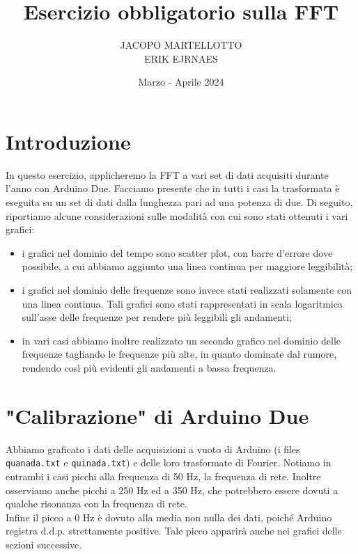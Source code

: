 \documentclass{article}[a4paper, oneside,11pt]
\title{Esercizio obbligatorio sulla FFT}
\author{JACOPO MARTELLOTTO\\ERIK EJRNAES}
\date{Marzo - Aprile 2024}
\begin{document}
\maketitle

\section{Introduzione}
In questo esercizio, applicheremo la FFT a vari set di dati acquisiti durante l'anno con Arduino Due. Facciamo presente che in tutti i casi la trasformata è eseguita su un set di dati dalla lunghezza pari ad una potenza di due. Di seguito, riportiamo alcune considerazioni sulle modalità con cui sono stati ottenuti i vari grafici:
\begin{itemize}
    \item i grafici nel dominio del tempo sono scatter plot, con barre d'errore dove possibile, a cui abbiamo aggiunto una linea continua per maggiore leggibilità;
    \item i grafici nel dominio delle frequenze sono invece stati realizzati solamente con una linea continua. Tali grafici sono stati rappresentati in scala logaritmica sull'asse delle frequenze per rendere più leggibili gli andamenti; 
    \item in vari casi abbiamo inoltre realizzato un secondo grafico nel dominio delle frequenze tagliando le frequenze più alte, in quanto dominate dal rumore, rendendo così più evidenti gli andamenti a bassa frequenza.
\end{itemize}

\section{"Calibrazione" di Arduino Due}
Abbiamo graficato i dati delle acquisizioni a vuoto di Arduino (i files \texttt{quanada.txt} e \texttt{quinada.txt}) e delle loro trasformate di Fourier.
Notiamo in entrambi i casi picchi alla frequenza di 50 Hz, la frequenza di rete. Inoltre osserviamo anche picchi a 250 Hz ed a 350 Hz, che potrebbero essere dovuti a qualche risonanza con la frequenza di rete.\\ Infine il picco a 0 Hz è dovuto alla media non nulla dei dati, poiché Arduino registra d.d.p. strettamente positive. Tale picco apparirà anche nei grafici delle sezioni successive.
\end{document}
